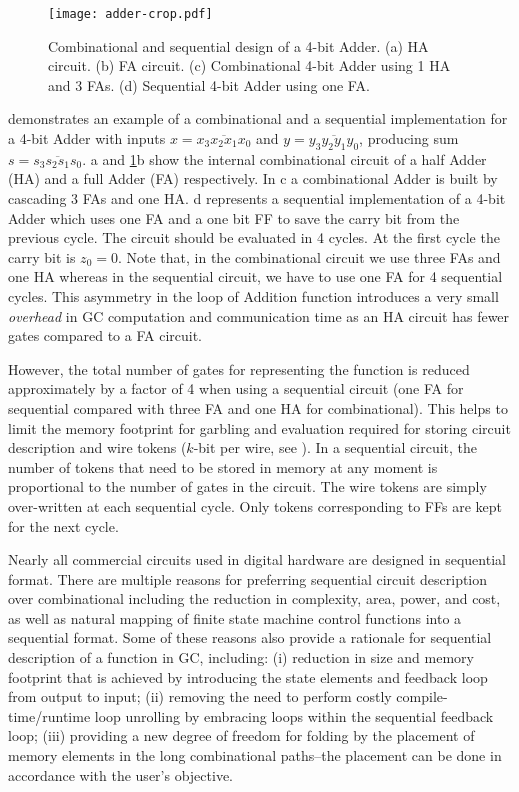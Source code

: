 \begin{figure}[h!]
    \centering
    \texttt{[image: adder-crop.pdf]}
    \caption{Combinational and sequential design of a 4-bit Adder.
  (a) HA circuit.
  (b) FA circuit.
  (c) Combinational 4-bit Adder using 1 HA and 3 FAs.
  (d) Sequential 4-bit Adder using one FA.}\label{fig:combSeq}
\end{figure}

 demonstrates an example of a combinational and a sequential implementation for a 4-bit Adder with inputs $x = \overline{x_3x_2x_1x_0}$ and $y = \overline{y_3y_2y_1y_0}$, producing sum $s = \overline{s_3s_2s_1s_0}$.
a and \ref{fig:combSeq}b show the internal combinational circuit of a half Adder (HA) and a full Adder (FA) respectively.
In c a combinational Adder is built by cascading 3 FAs and one HA.
d represents a sequential implementation of a 4-bit Adder which uses one FA and a one bit FF to save the carry bit from the previous cycle.
The circuit should be evaluated in 4 cycles.
At the first cycle the carry bit is $z_0=0$.
Note that, in the combinational circuit we use three FAs and one HA whereas in the sequential circuit, we have to use one FA for 4 sequential cycles.
This asymmetry in the loop of Addition function introduces a very small \emph{overhead} in GC computation and communication time as an HA circuit has fewer gates compared to a FA circuit.

However, the total number of gates for representing the function is reduced approximately by a factor of 4 when using a sequential circuit (one FA for sequential compared with three FA and one HA for combinational).
This helps to limit the memory footprint for garbling and evaluation required for storing circuit description and wire tokens ($k$-bit per wire, see ).
In a sequential circuit, the number of tokens that need to be stored in memory at any moment is proportional to the number of gates in the circuit.
The wire tokens are simply over-written at each sequential cycle.
Only tokens corresponding to FFs are kept for the next cycle.

Nearly all commercial circuits used in digital hardware are designed in sequential format.
There are multiple reasons for preferring sequential circuit description over combinational including the reduction in complexity, area, power, and cost, as well as natural mapping of finite state machine control functions into a sequential format.
Some of these reasons also provide a rationale for sequential description of a function in GC, including: (i) reduction in size and memory footprint that is achieved by introducing the state elements and feedback loop from output to input; (ii) removing the need to perform costly compile-time/runtime loop unrolling by embracing loops within the sequential feedback loop; (iii) providing a new degree of freedom for folding by the placement of memory elements in the long combinational paths--the placement can be done in accordance with the user's objective.

